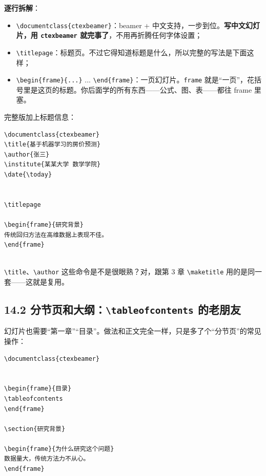 \textbf{逐行拆解}：

\begin{itemize}
\setlength{\itemsep}{2pt}
\item \texttt{\textbackslash{}documentclass\{ctexbeamer\}}：beamer + 中文支持，一步到位。\textbf{写中文幻灯片，用 \texttt{ctexbeamer} 就完事了}，不用再折腾任何字体设置；
\item \texttt{\textbackslash{}titlepage}：标题页。不过它得知道标题是什么，所以完整的写法是下面这样；
\item \texttt{\textbackslash{}begin\{frame\}\{...\}} ... \texttt{\textbackslash{}end\{frame\}}：一页幻灯片。\texttt{frame} 就是“一页”，花括号里是这页的标题。你后面学的所有东西——公式、图、表——都往 frame 里塞。
\end{itemize}

完整版加上标题信息：

\begin{lstlisting}
\documentclass{ctexbeamer}
\title{基于机器学习的房价预测}
\author{张三}
\institute{某某大学 数学学院}
\date{\today}


\titlepage

\begin{frame}{研究背景}
传统回归方法在高维数据上表现不佳。
\end{frame}


\end{lstlisting}

\texttt{\textbackslash{}title}、\texttt{\textbackslash{}author} 这些命令是不是很眼熟？对，跟第 3 章 \texttt{\textbackslash{}maketitle} 用的是同一套——这就是复用。

\subsection*{14.2 分节页和大纲：\texttt{\textbackslash{}tableofcontents} 的老朋友}

幻灯片也需要“第一章”“目录”。做法和正文完全一样，只是多了个“分节页”的常见操作：

\begin{lstlisting}
\documentclass{ctexbeamer}


\begin{frame}{目录}
\tableofcontents
\end{frame}

\section{研究背景}

\begin{frame}{为什么研究这个问题}
数据量大，传统方法力不从心。
\end{frame}


\end{lstlisting}

